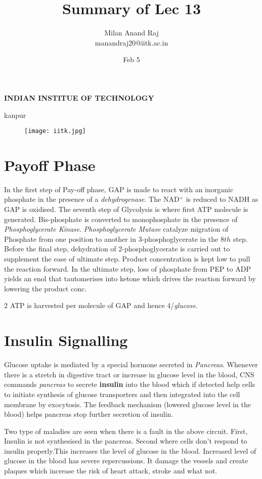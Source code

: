 \documentclass[12pt]{article}
\title{Summary of Lec 13}
\author{Milan Anand Raj\\manandraj20@iitk.ac.in}
\date{Feb 5}
\begin{document}
\NoBgThispage
\maketitle



\begin{center}
\textbf{INDIAN INSTITUE OF TECHNOLOGY}

kanpur
\end{center}


\vfill
\begin{figure}
\centering
\texttt{[image: iitk.jpg]}
\end{figure}
\clearpage
\tableofcontents
\clearpage
\NoBgThispage
\section{Payoff Phase}
In the first step of Pay-off phase, GAP is made to react with an inorganic phosphate in the presence of a \textit{dehydrogenase}. The NAD$^{+}$ is reduced to NADH as GAP is oxidised. The seventh step of Glycolysis is where first ATP molecule is generated. Bis-phosphate is converted to monophosphate in the presence of \textit{Phosphoglycerate Kinase}. \textit{Phosphoglycerate Mutase} catalyze migration of Phosphate from one position to another in 3-phosphoglycerate in the 8$th$ step. Before the final step, dehydration of 2-phosphoglycerate is carried out to supplement the ease of ultimate step. Product concentration is kept low to pull the reaction forward. In the ultimate step, loss of phosphate from PEP to ADP yields an enol that tautomerises into ketone which drives the reaction forward by lowering the product conc.

2 ATP is harvested per molecule of GAP and hence 4/\textit{glucose}.

  
\section{Insulin Signalling}
Glucose uptake is mediated by a special hormone secreted in \textit{Pancreas}. Whenever there is a stretch in digestive tract or increase in glucose level in the blood, CNS commands \textit{pancreas } to secrete \textbf{insulin} into the blood which if detected help cells to initiate synthesis of glucose transporters and then integrated into the cell membrane by exocytosis. The feedback mechanism (lowered glucose level in the blood)  helps pancreas stop further secretion of insulin.

Two type of maladies are seen when there is a fault in the above circuit. First, Insulin is not synthesised in the pancreas. Second where cells don't respond to insulin properly.This increases the level of glucose in the blood. Increased level of glucose in the blood has severe repercussions. It damage the vessels and create plaques which increase the risk of heart attack, stroke and what not.
\end{document}
